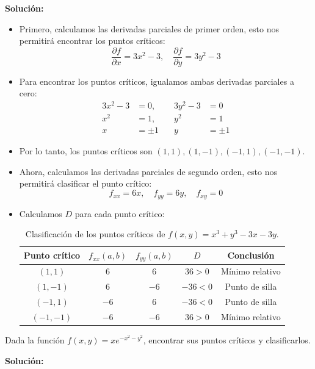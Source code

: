 \textbf{Solución:}
\begin{itemize}
    \item Primero, calculamos las derivadas parciales de primer orden, esto nos permitirá encontrar los puntos críticos:
        \[
        \frac{\partial f}{\partial x} = 3x^2 -3, \quad \frac{\partial f}{\partial y} = 3y^2 -3
        \]
    \item Para encontrar los puntos críticos, igualamos ambas derivadas parciales a cero:
     \begin{align*}
        3x^2 -3 &= 0, &\quad 3y^2 -3 &= 0\\
        x^2 &= 1, &\quad y^2 &= 1\\
        x&= \pm 1 &\quad y &= \pm 1
     \end{align*}
     \item Por lo tanto, los puntos críticos son $(1,1), (1,-1), (-1,1), (-1,-1)$.
     \item Ahora, calculamos las derivadas parciales de segundo orden, esto nos permitirá clasificar el punto crítico:
    \[
    f_{xx} = 6x, \quad f_{yy} = 6y, \quad f_{xy} = 0
    \]
    \item Calculamos $D$ para cada punto crítico:
    \begin{table}[H]
    \centering
    \begin{tabular}{|c|c|c|c|c|}
    \hline
    Punto crítico & $f_{xx}(a,b)$ & $f_{yy}(a,b)$ & $D$ & Conclusión \\
    \hline
    $(1,1)$ & $6$ & $6$ & $36 > 0$ & Mínimo relativo \\
    \hline
    $(1,-1)$ & $6$ & $-6$ & $-36 < 0$ & Punto de silla \\
    \hline
    $(-1,1)$ & $-6$ & $6$ & $-36 < 0$ & Punto de silla \\
    \hline
    $(-1,-1)$ & $-6$ & $-6$ & $36 > 0$ & Mínimo relativo \\
    \hline
    \end{tabular}
     \caption{Clasificación de los puntos críticos de $f(x,y)=x^3+y^3-3x-3y$.}
     \label{tab:clasificacion_puntos_criticos}
    \end{table}
\end{itemize}

\newpage
\begin{ejemplo}
    Dada la función $f(x,y)=xe^{-x^2-y^2}$, encontrar sus puntos críticos y clasificarlos.
\end{ejemplo}

\textbf{Solución:}

